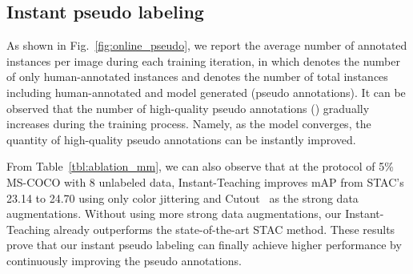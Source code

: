 \documentclass[final]{cvpr}
\begin{document}
\subsection{Instant pseudo labeling}

As shown in Fig.~\ref{fig:online_pseudo}, we report the average number of annotated instances per image during each training iteration, in which  denotes the number of only human-annotated instances and  denotes the number of total instances including human-annotated and model generated (pseudo annotations).
It can be observed that the number of high-quality pseudo annotations () gradually increases during the training process. Namely, as the model converges, the quantity of high-quality pseudo annotations can be instantly improved.



From Table~\ref{tbl:ablation_mm}, we can also observe that at the protocol of 5\% MS-COCO with 8 unlabeled data, Instant-Teaching improves mAP from STAC's 23.14 to 24.70 using only color jittering and Cutout~\cite{devries2017improved} as the strong data augmentations. Without using more strong data augmentations, our Instant-Teaching already outperforms the state-of-the-art STAC method.
These results prove that our instant pseudo labeling can finally achieve higher performance by continuously improving the pseudo annotations.
\end{document}
